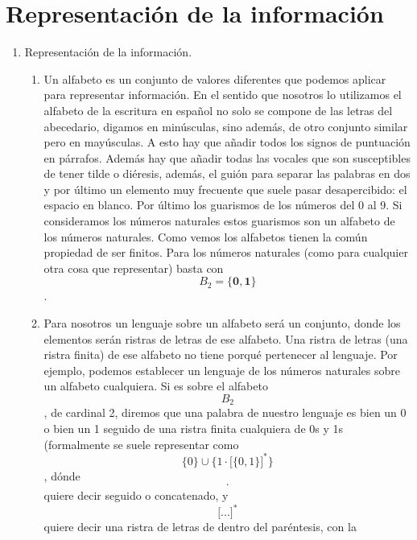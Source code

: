 \chapter{Representación de la información}

\begin{enumerate}
\def\labelenumi{\arabic{enumi}.}
\item
  Representación de la información.

  \begin{enumerate}
  \def\labelenumii{\arabic{enumii}.}
  \tightlist
  \item
    Un alfabeto es un conjunto de valores diferentes que podemos aplicar
    para represen\-tar información. En el sentido que nosotros lo
    utilizamos el alfabeto de la escritura en español no solo se compone
    de las letras del abecedario, digamos en minúsculas, sino además, de
    otro conjunto similar pero en mayúsculas. A esto hay que añadir
    todos los signos de puntuación en párrafos. Además hay que añadir
    todas las vocales que son susceptibles de tener tilde o diéresis,
    además, el guión para separar las palabras en dos y por último un
    elemento muy frecuente que suele pasar desapercibido: el espa\-cio
    en blanco. Por último los guarismos de los números del 0 al 9. Si
    consideramos los números naturales estos guarismos son un alfabeto
    de los números naturales. Como vemos los alfabetos tienen la común
    propiedad de ser finitos. Para los núme\-ros naturales (como para
    cualquier otra cosa que representar) basta con
    \[B_{\mathbf{\mathrm{2}}} = {\{{\mathbf{0,}\mathbf{1}}\}}\] .
  \item
    Para nosotros un lenguaje sobre un alfabeto será un conjunto, donde
    los elementos serán ristras de letras de ese alfabeto. Una ristra de
    letras (una ristra finita) de ese al\-fabeto no tiene porqué
    pertenecer al lenguaje. Por ejemplo, podemos establecer un lenguaje
    de los números naturales sobre un alfabeto cualquiera. Si es sobre
    el alfabe\-to \[B_{\mathbf{\mathrm{2}}}\], de cardinal 2, diremos
    que una palabra de nuestro lenguaje es bien un 0 o bien un 1 seguido
    de una ristra finita cualquiera de 0s y 1s (formalmente se suele
    re\-presentar como
    \[{\{ 0\}} \cup {\{{1 \cdot {\lbrack{\{ 0,1\}}\rbrack}^{\ast}}\}}\],
    dónde \textquotesingle{}\[\cdot\]\textquotesingle{} quiere decir
    seguido o conca\-tenado, y
    \textquotesingle\textquotesingle{}\[{\lbrack...\rbrack}^{\ast}\]\textquotesingle\textquotesingle{}
    quiere decir una ristra de letras de dentro del paréntesis, con la

\end{enumerate}
\end{enumerate}
